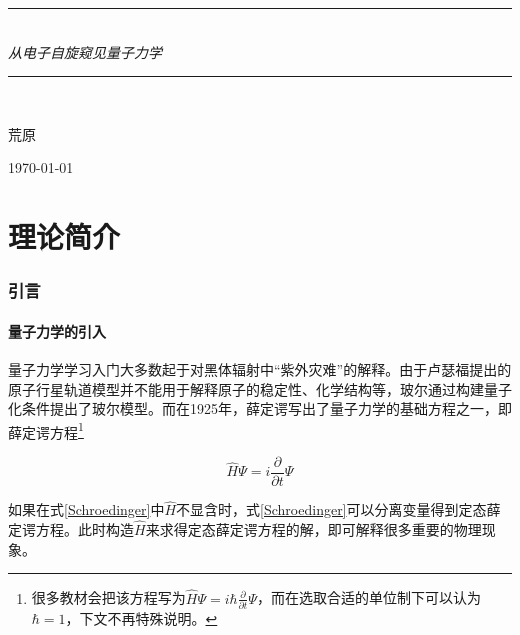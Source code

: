 \documentclass[UTF8,12pt]{article}
\numberwithin{equation}{subsection}
\newcommand{\HRule}{\rule{\linewidth}{0.5mm}}
\begin{document}
	\begin{titlepage}
		\begin{center}    
			\HRule \\[0.4cm]
			{ \huge \emph {从电子自旋窥见量子力学}}\\[0.4cm]%
			\rule{\linewidth}{0.2mm} \\[1.5cm]
			
			\begin{minipage}{0.4\textwidth}
				\begin{flushleft} \large
				\end{flushleft}
			\end{minipage}
			\begin{minipage}{0.4\textwidth}
				\begin{flushright} \large
					\Large 荒原%
				\end{flushright}
			\end{minipage}
			\vfill
			{\large \today}
		\end{center}
	\end{titlepage}
	\clearpage
	\tableofcontents
	\clearpage
	\part{理论简介}
	\section{引言}
	\subsection{量子力学的引入}
	量子力学学习入门大多数起于对黑体辐射中“紫外灾难”的解释。由于卢瑟福提出的原子行星轨道模型并不能用于解释原子的稳定性、化学结构等，玻尔通过构建量子化条件提出了玻尔模型。而在1925年，薛定谔写出了量子力学的基础方程之一，即薛定谔方程\footnote{很多教材会把该方程写为$\hat H\Psi=i\hbar \frac{\partial}{\partial t}\Psi$，而在选取合适的单位制下可以认为$\hbar=1$，下文不再特殊说明。}
	\begin{snugshade}
		\begin{equation}
			\hat H\Psi=i\frac{\partial}{\partial t}\Psi
			\label{Schroedinger}
		\end{equation}
	\end{snugshade}
		
	如果在式\ref{Schroedinger}中$\hat H$不显含时，式\ref{Schroedinger}可以分离变量得到定态薛定谔方程。此时构造$\hat H$来求得定态薛定谔方程的解，即可解释很多重要的物理现象。
	
\end{document}
